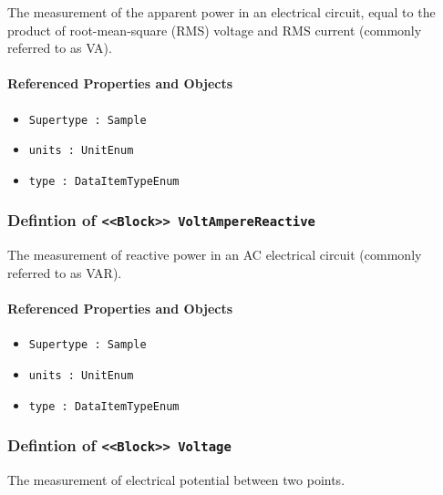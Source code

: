 \FloatBarrier

The measurement of the apparent power in an electrical circuit, equal to the product of root-mean-square (RMS) voltage and RMS current (commonly referred to as VA).

\FloatBarrier
\paragraph{Referenced Properties and Objects}

\begin{itemize}
\item \texttt{Supertype : Sample}

\item \texttt{units : UnitEnum}

\item \texttt{type : DataItemTypeEnum}

\end{itemize}
\FloatBarrier
\subsubsection{Defintion of \texttt{<<Block>> VoltAmpereReactive}}
  \label{type:VoltAmpereReactive}

\FloatBarrier

The measurement of reactive power in an AC electrical circuit (commonly referred to as VAR).

\FloatBarrier
\paragraph{Referenced Properties and Objects}

\begin{itemize}
\item \texttt{Supertype : Sample}

\item \texttt{units : UnitEnum}

\item \texttt{type : DataItemTypeEnum}

\end{itemize}
\FloatBarrier
\subsubsection{Defintion of \texttt{<<Block>> Voltage}}
  \label{type:Voltage}

\FloatBarrier

The measurement of electrical potential between two points.

